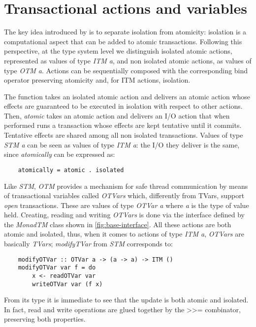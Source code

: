 \section{Transactional actions and variables}
The key idea introduced by \citet{OpenTransactionsSpec} is to separate isolation from atomicity: isolation is a computational aspect that can be added to atomic transactions.
Following this perspective, at the type system level we distinguish isolated atomic actions, represented as values of type \emph{ITM a}, and non isolated atomic actions, as values of type \emph{OTM a}. Actions can be sequentially composed with the corresponding bind operator preserving atomicity and, for ITM actions, isolation.

The function  takes an isolated atomic action and delivers an atomic action whose effects are guaranteed to be executed in isolation with respect to other actions.
Then, \emph{atomic} takes an atomic action and delivers an I/O action that when performed runs a transaction whose effects are kept tentative until it commits.
Tentative effects are shared among all non isolated transactions. Values of type \emph{STM a} can be seen as values of type \emph{ITM a}: the I/O they deliver is the same, since \emph{atomically} can be expressed as:
\begin{lstlisting}
    atomically = atomic . isolated
\end{lstlisting}

Like \emph{STM}, \emph{OTM} provides a mechanism for safe thread
communication by means of transactional variables called \emph{OTVars}
which, differently from TVars, support \emph{open} transactions.
These are values of type \emph{OTVar a} where \emph{a} is the type of value held.
Creating, reading and writing \emph{OTVars} is done via the interface defined by the \emph{MonadTM} class shown in \cref{fig:base-interface}. 
All these actions are both atomic and isolated, thus, when it comes to actions of type \emph{ITM a}, \emph{OTVars} are basically \emph{TVars};
\eg \emph{modifyTVar} from \emph{STM} corresponds to:
\begin{lstlisting}
    modifyOTVar :: OTVar a -> (a -> a) -> ITM ()
    modifyOTVar var f = do
        x <- readOTVar var
        writeOTVar var (f x) 
\end{lstlisting}
From its type it is immediate to see that the update is both atomic and isolated. In fact, read and write operations are glued together by the \textgreater \textgreater= combinator, preserving both properties.


